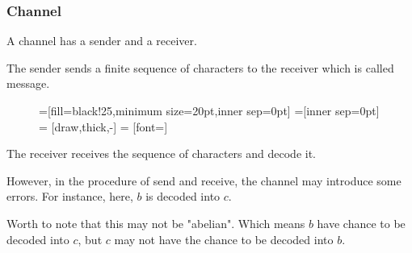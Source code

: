 \documentclass{beamer}
\begin{document}
                  \begin{frame}
                        \frametitle{Channel}
                        \begin{definition}[channel]
                              A channel has a sender and a receiver.
                              \pause

                              The sender sends a finite sequence of characters to the receiver which is called message.
                              \begin{figure}[h!]
                                    =[fill=black!25,minimum size=20pt,inner sep=0pt]
                                    =[inner sep=0pt]
                                     = [draw,thick,-]
                                     = [font=\small]
                              \end{figure}
                              \pause
                              
                              The receiver receives the sequence of characters and decode it.
                              \pause

                              However, in the procedure of send and receive, the channel may introduce some errors. For instance, here, $b$ is decoded into $c$. 

                              Worth to note that this may not be "abelian". Which means $b$ have chance to be decoded into $c$, but $c$ may not have the chance to be decoded into $b$.
                        \end{definition}
                  \end{frame}
\end{document}

